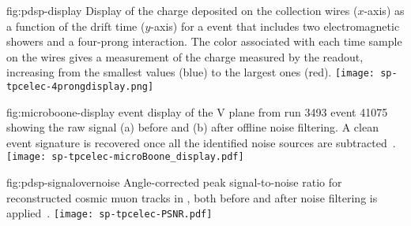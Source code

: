 \begin{dunefigure}
{fig:pdsp-display}
{Display of the charge deposited on the collection wires ($x$-axis) as
a function of the drift time ($y$-axis) for a  event 
that includes two electromagnetic showers and a four-prong interaction.
The color associated with each time sample on the 
wires gives a measurement of the charge measured by the 
readout, increasing from the smallest values (blue) to the largest
ones (red).}
\texttt{[image: sp-tpcelec-4prongdisplay.png]}
\end{dunefigure}

\begin{dunefigure}
{fig:microboone-display}
{ \twod event display of the V plane from run 3493 
event 41075 showing the raw signal (a) before and (b) after offline 
noise filtering. A clean event signature is recovered once all the 
identified noise sources are subtracted~\cite{Acciarri:2017sde}.}
\texttt{[image: sp-tpcelec-microBoone\_display.pdf]}
\end{dunefigure}


\begin{dunefigure}
{fig:pdsp-signalovernoise}
{Angle-corrected peak signal-to-noise ratio for reconstructed cosmic muon tracks in
 , both before and after noise filtering is applied~\cite{pend_PDSP_PerfPaper}.}
\texttt{[image: sp-tpcelec-PSNR.pdf]}
\end{dunefigure}

